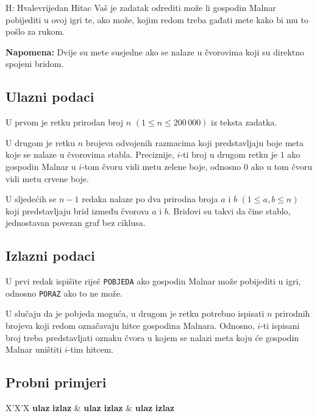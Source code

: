 \begin{statement}[
  timelimit=1 s,
  memorylimit=512 MiB,
]{H: Hvalevrijedan Hitac}
Vaš je zadatak odrediti može li gospodin Malnar pobijediti u ovoj igri te, ako
može, kojim redom treba gađati mete kako bi mu to pošlo za rukom.

\textbf{Napomena:} Dvije su mete susjedne ako se nalaze u čvorovima koji su
direktno spojeni bridom.

\subsection*{Ulazni podaci}
U prvom je retku prirodan broj $n$ $(1 \le n \le 200\,000)$ iz teksta zadatka.

U drugom je retku $n$ brojeva odvojenih razmacima koji predstavljaju boje meta
koje se nalaze u čvorovima stabla. Preciznije, $i$-ti broj u drugom retku je $1$
ako gospodin Malnar u $i$-tom čvoru vidi metu zelene boje, odnosno $0$ ako u tom
čvoru vidi metu crvene boje.

U sljedećih se $n-1$ redaka nalaze po dva prirodna broja $a$ i $b$ $(1 \le a, b
\le n)$ koji predstavljaju brid između čvorova $a$ i $b$. Bridovi su takvi da
čine stablo, jednostavan povezan graf bez ciklusa.

\subsection*{Izlazni podaci}
U prvi redak ispišite riječ \texttt{POBJEDA} ako gospodin Malnar može
pobijediti u igri, odnosno \texttt{PORAZ} ako to ne može.

U slučaju da je pobjeda moguća, u drugom je retku potrebno ispisati $n$
prirodnih brojeva koji redom označavaju hitce gospodina Malnara. Odnosno,
$i$-ti ispisani broj treba predstavljati oznaku čvora u kojem se nalazi meta
koju će gospodin Malnar uništiti $i$-tim hitcem.

\subsection*{Probni primjeri}
\begin{tabularx}{\textwidth}{X'X'X}
  \textbf{ulaz}
  \linespread{1}{}
  \textbf{izlaz}
  \linespread{1}{} &
  \textbf{ulaz}
  \linespread{1}{}
  \textbf{izlaz}
  \linespread{1}{} &
  \textbf{ulaz}
  \linespread{1}{}
  \textbf{izlaz}
  \linespread{1}{}
\end{tabularx}

\end{statement}

